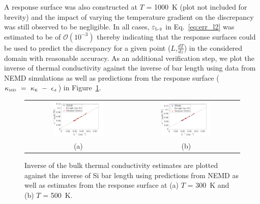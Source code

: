  A response surface was also constructed at $T$ = 1000~K (plot not included for brevity) and the impact of
 varying the temperature gradient on the discrepancy was still observed to be negligible. In all cases,
 $\varepsilon_{\tiny{\mbox{L-2}}}$ in Eq.~\ref{eq:err_l2} was estimated to be of $\mathcal{O}(10^{-3})$ thereby
 indicating that the response surfaces could be used to predict the discrepancy for a given
 point ($L$,$\frac{dT}{dz}$) in the considered domain with reasonable accuracy. As an additional verification
 step, we plot the inverse of thermal conductivity against the inverse of bar length using data from NEMD
 simulations as well as predictions from the response surface 
($\kappa_{\mbox{\tiny{MD}}}~=~\kappa_{\mbox{\tiny{E}}}~-~\epsilon_{\mbox{\tiny{d}}}$) in Figure~\ref{fig:kinv}.
%
\begin{figure}[htbp]
\begin{center}
\begin{tabular}{cc}
 \hspace{-10mm}
  \includegraphics[width=0.50\textwidth]{./Figures/kinv_300}
  &
  \includegraphics[width=0.50\textwidth]{./Figures/kinv_500}
  \\ (a) & (b)
  \end{tabular}
 \caption{Inverse of the bulk thermal conductivity estimates are plotted against the inverse of Si bar length
 using predictions from NEMD as well as estimates from the response surface at (a)  $T$ = 300~K and 
 (b) $T$ = 500~K. }
\label{fig:kinv}
\end{center}
\end{figure}
